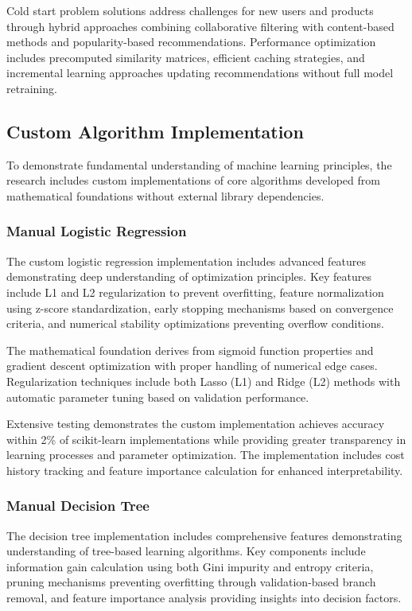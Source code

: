 \documentclass[12pt]{article}
\begin{document}
Cold start problem solutions address challenges for new users and products through hybrid approaches combining collaborative filtering with content-based methods and popularity-based recommendations. Performance optimization includes precomputed similarity matrices, efficient caching strategies, and incremental learning approaches updating recommendations without full model retraining.

\subsection{Custom Algorithm Implementation}
To demonstrate fundamental understanding of machine learning principles, the research includes custom implementations of core algorithms developed from mathematical foundations without external library dependencies.

\subsubsection{Manual Logistic Regression}
The custom logistic regression implementation includes advanced features demonstrating deep understanding of optimization principles. Key features include L1 and L2 regularization to prevent overfitting, feature normalization using z-score standardization, early stopping mechanisms based on convergence criteria, and numerical stability optimizations preventing overflow conditions.

The mathematical foundation derives from sigmoid function properties and gradient descent optimization with proper handling of numerical edge cases. Regularization techniques include both Lasso (L1) and Ridge (L2) methods with automatic parameter tuning based on validation performance.

Extensive testing demonstrates the custom implementation achieves accuracy within 2\% of scikit-learn implementations while providing greater transparency in learning processes and parameter optimization. The implementation includes cost history tracking and feature importance calculation for enhanced interpretability.

\subsubsection{Manual Decision Tree}
The decision tree implementation includes comprehensive features demonstrating understanding of tree-based learning algorithms. Key components include information gain calculation using both Gini impurity and entropy criteria, pruning mechanisms preventing overfitting through validation-based branch removal, and feature importance analysis providing insights into decision factors.
\end{document}
